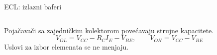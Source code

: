 \begin{frame}[label=10-s089]{ECL: izlazni baferi}
\setlength{\abovedisplayskip}{4pt}\setlength{\belowdisplayskip}{4pt}\setlength{\abovedisplayshortskip}{3pt}\setlength{\belowdisplayshortskip}{3pt}
\begin{columns}[T,onlytextwidth]\centering \end{columns}\smallskip
Pojačavači sa zajedničkim kolektorom povećavaju strujne kapacitete.
\[V_{OL}=V_{CC}-R_CI_E-V_{BE},\qquad V_{OH}=V_{CC}-V_{BE}\]
\centering Uslovi za izbor elemenata se ne menjaju.
\end{frame}
